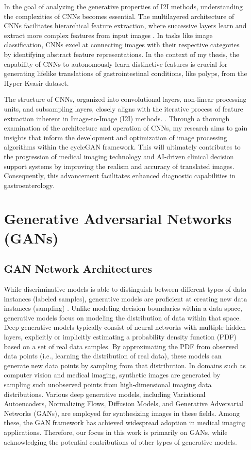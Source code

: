 \documentclass[UKenglish,12pt]{master-style}
\begin{document}
In the goal of analyzing the generative properties of I2I methods, understanding the complexities of CNNs becomes essential. The multilayered architecture of CNNs facilitates hierarchical feature extraction, where successive layers learn and extract more complex features from input images \cite{deep_CNN}. In tasks like image classification, CNNs excel at connecting images with their respective categories by identifying abstract feature representations. In the context of my thesis, the capability of CNNs to autonomously learn distinctive features is crucial for generating lifelike translations of gastrointestinal conditions, like polyps, from the Hyper Kvasir dataset.

The structure of CNNs, organized into convolutional layers, non-linear processing units, and subsampling layers, closely aligns with the iterative process of feature extraction inherent in Image-to-Image (I2I) methods.\cite{CNN} . Through a thorough examination of the architecture and operation of CNNs, my research aims to gain insights that inform the development and optimization of image processing algorithms within the cycleGAN framework. This will ultimately contributes to the progression of medical imaging technology and AI-driven clinical decision support systems by improving the realism and accuracy of translated images. Consequently, this advancement facilitates enhanced diagnostic capabilities in gastroenterology.

\section{Generative Adversarial Networks (GANs)}

\subsection{GAN Network Architectures}

While discriminative models is able to distinguish between different types of data instances (labeled samples), generative models are proficient at creating new data instances (sampling) \cite{medigan}. Unlike modeling decision boundaries within a data space, generative models focus on modeling the distribution of data within that space. Deep generative models typically consist of neural networks with multiple hidden layers, explicitly or implicitly estimating a probability density function (PDF) based on a set of real data samples. By approximating the PDF from observed data points (i.e., learning the distribution of real data), these models can generate new data points by sampling from that distribution. In domains such as computer vision and medical imaging, synthetic images are generated by sampling such unobserved points from high-dimensional imaging data distributions. Various deep generative models, including Variational Autoencoders, Normalizing Flows, Diffusion Models, and Generative Adversarial Networks (GANs), are employed for synthesizing images in these fields. Among these, the GAN framework has achieved widespread adoption in medical imaging applications. Therefore, our focus in this work is primarily on GANs, while acknowledging the potential contributions of other types of generative models.
\end{document}
